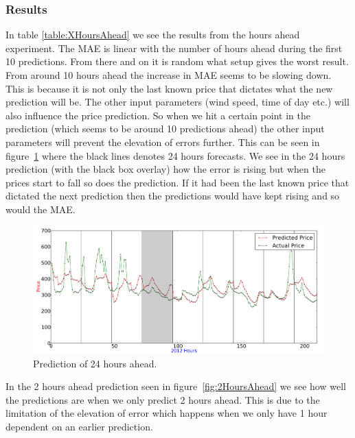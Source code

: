 \subsubsection{Results}
In table \ref{table:XHoursAhead} we see the results from the hours ahead experiment. The MAE is linear with the number of hours ahead during the first 10 predictions. From there and on it is random what setup gives the worst result. From around 10 hours ahead the increase in MAE seems to be slowing down. This is because it is not only the last known price that dictates what the new prediction will be. The other input parameters (wind speed, time of day etc.) will also influence the price prediction. So when we hit a certain point in the prediction (which seems to be around 10 predictions ahead) the other input parameters will prevent the elevation of errors further. This can be seen in figure~\ref{fig:24HoursAhead_elevationOfError} where the black lines denotes 24 hours forecasts. We see in the 24 hours prediction (with the black box overlay) how the error is rising but when the prices start to fall so does the prediction. If it had been the last known price that dictated the next prediction then the predictions would have kept rising and so would the MAE.

\begin{figure}[H]
\centering
\includegraphics[width=\linewidth]{billeder/PriceExperimentalAnalysis/24HoursAhead_ElevationOfErrorExample.png}
\caption{Prediction of 24 hours ahead.}
\label{fig:24HoursAhead_elevationOfError}
\end{figure}

In the 2 hours ahead prediction seen in figure~\ref{fig:2HoursAhead} we see how well the predictions are when we only predict 2 hours ahead. This is due to the limitation of the elevation of error which happens when we only have 1 hour dependent on an earlier prediction.

